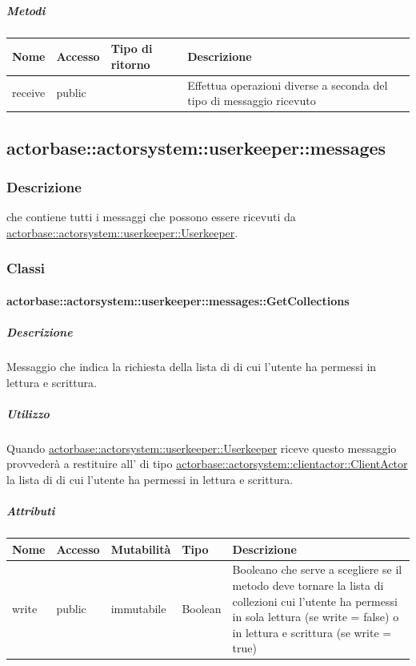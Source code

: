 \documentclass{scalatekids-article}
\begin{document}
\subparagraph{Metodi}
\begin{tabular}{| l | l | l | l |}
  \hline
  Nome & Accesso & Tipo di ritorno & Descrizione\\
  \hline
  receive & public &  & Effettua operazioni diverse a seconda del tipo di messaggio ricevuto\\
  \hline
\end{tabular}

\subsection{actorbase::actorsystem::userkeeper::messages}
\label{sec:actorbase::actorsystem::userkeeper::messages}

\subsubsection{Descrizione}

 che contiene tutti i messaggi che possono essere ricevuti da
\hyperref[sec:actorbase::actorsystem::userkeeper::Userkeeper]{actorbase::actorsystem::userkeeper::Userkeeper}.

\subsubsection{Classi}

\paragraph{actorbase::actorsystem::userkeeper::messages::GetCollections}
\label{sec:actorbase::actorsystem::userkeeper::messages::GetCollections}

\subparagraph{Descrizione}
Messaggio che indica la richiesta della lista di  di cui
l'utente ha permessi in lettura e scrittura.

\subparagraph{Utilizzo}
Quando \hyperref[sec:actorbase::actorsystem::userkeeper::Userkeeper]{actorbase::\allowbreak{}actorsystem::\allowbreak{}userkeeper::\allowbreak{}Userkeeper}
riceve questo messaggio provvederà a restituire all' di tipo
\hyperref[sec:actorbase::actorsystem::clientactor::ClientActor]{actorbase::\allowbreak{}actorsystem::\allowbreak{}clientactor::\allowbreak{}ClientActor}
la lista di  di cui l'utente ha permessi in lettura
e scrittura.

\subparagraph{Attributi}
\begin{tabular}{| p{3cm} | p{1.5cm} | p{2cm} | p{2cm} | p{8.5cm} |}
  \hline
  Nome & Accesso & Mutabilità & Tipo & Descrizione\\
  \hline
  write & public & immutabile & Boolean & Booleano che serve a scegliere se il metodo deve tornare la lista di collezioni cui l'utente ha permessi in sola lettura (se write = false) o in lettura e scrittura (se write = true) \\
  \hline
\end{tabular}
\end{document}
